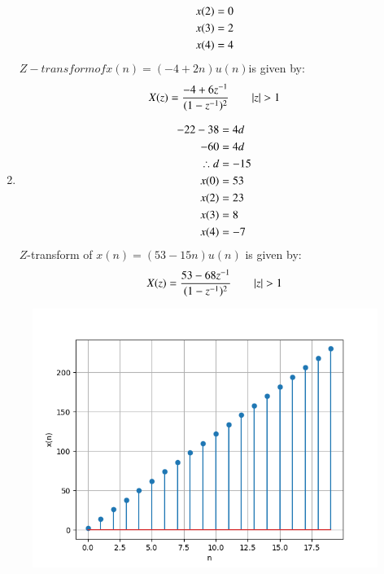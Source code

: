 \documentclass[journal,12pt,twocolumn]{IEEEtran}
\theoremstyle{remark}
\begin{document}
\begin{center}
\begin{enumerate}
\begin{align}
          x(2)&=0\\
          x(3)&=2 \\
          x(4)&=4 \notag\\
    \end{align}
    $Z-transform of x(n) = (-4 + 2n)u(n) $is given by:
    \begin{align}
       &X(z)=\frac{-4+6{z^{-1}}}{(1-{z^{-1}})^2} \qquad  |z|>1  \notag\\
    \end{align}
       \item    
     \begin{align}
         -22-38&=4d\\
          -60&=4d\\
           \therefore d&=-15\\
            x(0)&=53\\
            x(2)&=23\\
            x(3)&=8\\
            x(4)&=-7 \notag\\
     \end{align}
     $Z$-transform of $x(n) = (53 - 15n)u(n)$ is given by:
\begin{align}
       &X(z)=\frac{53-68{z^{-1}}}{(1-{z^{-1}})^2}\qquad|z|>1 \notag \\
\end{align}
\end{enumerate}             
          
\end{center}

\begin{figure}[h]
       \centering
        \includegraphics[width=1\linewidth]{figs/plot1.png} %
        \caption{}
\end{figure}
\end{document}
